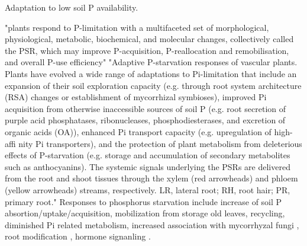 \documentclass[10pt,letterpaper]{article}
\begin{document}
Adaptation to low soil P availability.

"plants respond to P-limitation with a multifaceted set of morphological, physiological, metabolic, biochemical, and molecular changes, collectively called the PSR, which may improve P-acquisition, P-reallocation and remobilisation, and overall P-use efficiency"  \cite{Lambers:2015fx}
"Adaptive P-starvation responses of vascular plants. Plants have evolved a wide range of adaptations to Pi-limitation that include an expansion of their soil exploration capacity (e.g. through root system architecture (RSA) changes or establishment of mycorrhizal symbioses), improved Pi acquisition from otherwise inaccessible sources of soil P (e.g. root secretion of purple acid phosphatases, ribonucleases, phosphodiesterases, and excretion of organic acids (OA)), enhanced Pi transport capacity (e.g. upregulation of high-affi nity Pi transporters), and the protection of plant metabolism from deleterious effects of P-starvation (e.g. storage and accumulation of secondary metabolites such as anthocyanins). The systemic signals underlying the PSRs are delivered from the root and shoot tissues through the xylem (red arrowheads) and phloem (yellow arrowheads) streams, respectively. LR, lateral root; RH, root hair; PR, primary root." \cite{Lambers:2015fx}
 Responses to phosphorus starvation include increase of soil P absortion/uptake/acquisition, mobilization from storage old leaves, recycling, diminished Pi related metabolism, increased association with mycorrhyzal fungi \cite{Lambers:2015fx}, root modification \cite{Lambers:2015fx}, hormone signanling \cite{Lambers:2015fx}. 
\end{document}

